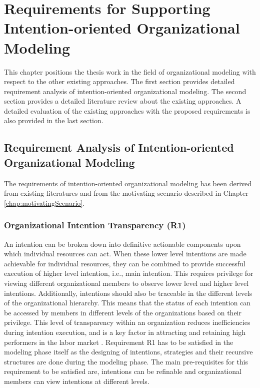 \chapter{Requirements for Supporting Intention-oriented Organizational Modeling}
\label{chap:analysis}
This chapter positions the thesis work in the field of organizational modeling with respect to the other existing approaches. The first section provides detailed requirement analysis of intention-oriented organizational modeling. The second section provides a detailed literature review about the existing approaches. A detailed evaluation of the existing approaches with the proposed requirements is also provided in the last section.

\section{Requirement Analysis of Intention-oriented Organizational Modeling}
\label{sec:requirementssupoorting}
The requirements of intention-oriented organizational modeling has been derived from existing literatures \cite{McManus2007, Mandic2010,Bleistein2006, Lacom, Brambilla2012} and from the motivating scenario described in Chapter \ref{chap:motivatingScenario}. 

\subsection{Organizational Intention Transparency (R1)}
An intention can be broken down into definitive actionable components upon which individual resources can act. When these lower level intentions are made achievable for individual resources, they can be combined to provide successful execution of higher level intention, i.e., main intention. This requires privilege for viewing different organizational members to observe lower level and higher level intentions. Additionally, intentions should also be traceable in the different levels of the organizational hierarchy. This means that the status of each intention can be accessed by members in different levels of the organizations based on their privilege. This level of transparency within an organization reduces inefficiencies during intention execution, and is a key factor in attracting and retaining high performers in the labor market \cite{McManus2007}. Requirement R1 has to be satisfied in the modeling phase itself as the designing of intentions, strategies and their recursive structures are done during the modeling phase. The main pre-requisites for this requirement to be satisfied are, intentions can be refinable and organizational members can view intentions at different levels. 

